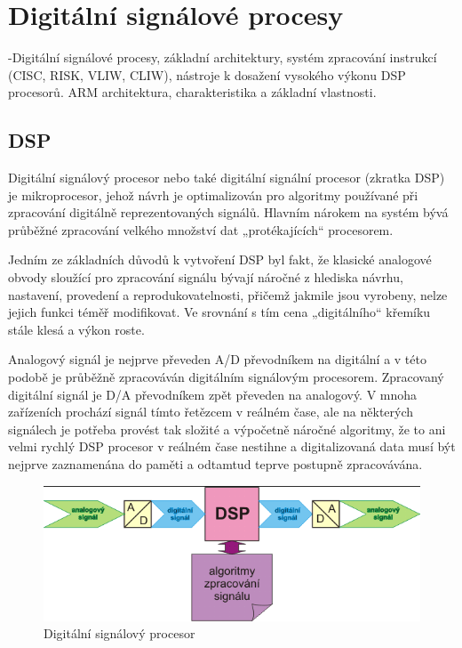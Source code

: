 \section{Digitální signálové procesy}
-Digitální signálové procesy, základní architektury, systém zpracování instrukcí (CISC,
RISK, VLIW, CLIW), nástroje k dosažení vysokého výkonu DSP procesorů. ARM
architektura, charakteristika a základní vlastnosti.

\subsection{DSP}
Digitální signálový procesor nebo také digitální signální procesor (zkratka DSP) je mikroprocesor, jehož návrh je optimalizován pro algoritmy používané při zpracování digitálně reprezentovaných signálů. Hlavním nárokem na systém bývá průběžné zpracování velkého množství dat „protékajících“ procesorem.

Jedním ze základních důvodů k vytvoření DSP byl fakt, že klasické analogové obvody sloužící pro zpracování signálu bývají náročné z hlediska návrhu, nastavení, provedení a reprodukovatelnosti, přičemž jakmile jsou vyrobeny, nelze jejich funkci téměř modifikovat. Ve srovnání s tím cena „digitálního“ křemíku stále klesá a výkon roste.

 Analogový signál je nejprve převeden A/D převodníkem na digitální a v této podobě je průběžně zpracováván digitálním signálovým procesorem. Zpracovaný digitální signál je D/A převodníkem zpět převeden na analogový. V mnoha zařízeních prochází signál tímto řetězcem v reálném čase, ale na některých signálech je potřeba provést tak složité a výpočetně náročné algoritmy, že to ani velmi rychlý DSP procesor v reálném čase nestihne a digitalizovaná data musí být nejprve zaznamenána do paměti a odtamtud teprve postupně zpracovávána.
    \begin{figure}[h]
   \begin{center}
     \includegraphics[scale=0.4]{images/DSP.png}
   \end{center}
   \caption{Digitální signálový procesor}
  \end{figure} 
 
